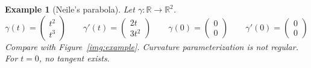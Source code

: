\documentclass{article}
\newtheorem{example}{Example}  \numberwithin{example}{section}
\begin{document}
\begin{example}[Neile's parabola]
  \label{ex:e}
  Let $\gamma: \mathbb R \to \mathbb R^2$.
  \[ \gamma(t) = \begin{pmatrix} t^2 \\ t^3 \end{pmatrix} \qquad \gamma'(t) = \begin{pmatrix} 2t \\ 3t^2 \end{pmatrix} \qquad \gamma(0) = \begin{pmatrix} 0 \\ 0 \end{pmatrix} \qquad \gamma'(0) = \begin{pmatrix} 0 \\ 0 \end{pmatrix} \]
  Compare with Figure~\ref{img:example}.
  Curvature parameterization is not regular.
  For $t = 0$, no tangent exists.
\end{example}
\end{document}
